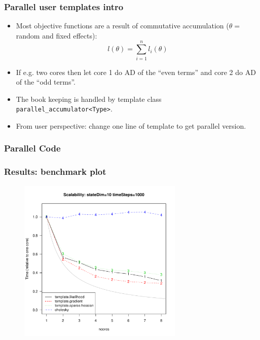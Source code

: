 \documentclass[compress]{beamer}
\begin{document}
\begin{frame}
  \frametitle{Parallel user templates intro}
  \begin{itemize}
  \item Most objective functions are a result of commutative
    accumulation ($\theta=$ random and fixed effects):
    \[l(\theta) = \sum_{i=1}^n l_i(\theta)\]
  \item If e.g. two cores then let core 1 do AD of the ``even terms'' and
    core 2 do AD of the ``odd terms''.
  \item The book keeping is handled by template class
    \texttt{parallel\_accumulator<Type>}.
  \item From user perspective: change one line of template to get
    parallel version.
  \end{itemize}
\end{frame}

\begin{frame}
  \frametitle{Parallel Code}
\end{frame}

\begin{frame}
  \frametitle{Results: benchmark plot}
    \begin{figure}[!htb]
      \centering
      \includegraphics[width=0.7\textwidth]{results/scalability.pdf}
    \end{figure}
\end{frame}
\end{document}
